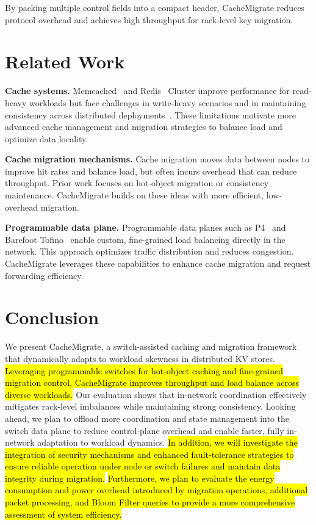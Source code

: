 \documentclass[conference]{IEEEtran}
\DeclareRobustCommand{\hlRevA}[1]{{\sethlcolor{white}\hl{#1}}}%
\DeclareRobustCommand{\hlRevB}[1]{{\sethlcolor{white}\hl{#1}}}%
\DeclareRobustCommand{\hlme}[1]{{\sethlcolor{white}\hl{#1}}}
\begin{document}
By packing multiple control fields into a compact header, CacheMigrate reduces protocol overhead and achieves high throughput for rack-level key migration.


\section{Related Work}
\label{sec:related_work}

\textbf{Cache systems.}
Memcached~\cite{memcachedMemcachedDistributed} and Redis~\cite{redisRedisRealtime} Cluster improve performance for read-heavy workloads but face challenges in write-heavy scenarios and in maintaining consistency across distributed deployments~\cite{ghemawat2003google, beaver2010finding}. These limitations motivate more advanced cache management and migration strategies to balance load and optimize data locality.

\textbf{Cache migration mechanisms.}
Cache migration moves data between nodes to improve hit rates and balance load, but often incurs overhead that can reduce throughput. Prior work focuses on hot-object migration or consistency maintenance. CacheMigrate builds on these ideas with more efficient, low-overhead migration.

\textbf{Programmable data plane.}
Programmable data planes such as P4~\cite{opennetworkingOpenNetworking} and Barefoot Tofino~\cite{tofino} enable custom, fine-grained load balancing directly in the network. This approach optimizes traffic distribution and reduces congestion. CacheMigrate leverages these capabilities to enhance cache migration and request forwarding efficiency.


\section{Conclusion}
\label{sec:Conclusion}

We present CacheMigrate, a switch-assisted caching and migration framework that dynamically adapts to workload skewness in distributed KV stores. \hlme{Leveraging programmable switches for hot-object caching and fine-grained migration control, CacheMigrate improves throughput and load balance across diverse workloads.} Our evaluation shows that in-network coordination effectively mitigates rack-level imbalances while maintaining strong consistency. Looking ahead, we plan to offload more coordination and state management into the switch data plane to reduce control-plane overhead and enable faster, fully in-network adaptation to workload dynamics. \hlRevB{In addition, we will investigate the integration of security mechanisms and enhanced fault-tolerance strategies to ensure reliable operation under node or switch failures and maintain data integrity during migration.} \hlRevA{Furthermore, we plan to evaluate the energy consumption and power overhead introduced by migration operations, additional packet processing, and Bloom Filter queries to provide a more comprehensive assessment of system efficiency.}
\end{document}
